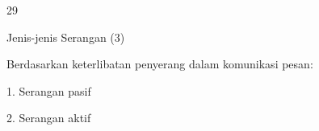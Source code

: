 \documentclass{article}
\begin{document}

29

Jenis-jenis Serangan (3)

Berdasarkan keterlibatan penyerang dalam komunikasi pesan:

1. Serangan pasif

2. Serangan aktif
\end{document}
